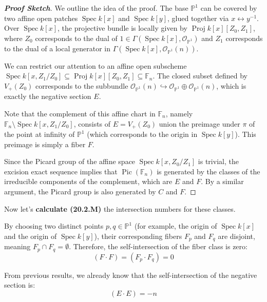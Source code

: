 \begin{proof}[\textbf{Proof Sketch}]
We outline the idea of the proof. The base $\mathbb{P}^1$ can be covered by two affine open patches $\operatorname{Spec} k[x]$ and $\operatorname{Spec} k[y]$, glued together via $x \leftrightarrow y^{-1}$. Over $\operatorname{Spec} k[x]$, the projective bundle is locally given by $\operatorname{Proj} k[x][Z_0, Z_1]$, where $Z_0$ corresponds to the dual of $1 \in \Gamma(\operatorname{Spec} k[x], \mathcal{O}_{\mathbb{P}^1})$ and $Z_1$ corresponds to the dual of a local generator in $\Gamma(\operatorname{Spec} k[x], \mathcal{O}_{\mathbb{P}^1}(n))$. 

We can restrict our attention to an affine open subscheme $\operatorname{Spec} k[x, Z_1/Z_0] \subseteq \operatorname{Proj} k[x][Z_0, Z_1] \subseteq \mathbb{F}_n$. The closed subset defined by $V_+(Z_0)$ corresponds to the subbundle $\mathcal{O}_{\mathbb{P}^1}(n) \hookrightarrow \mathcal{O}_{\mathbb{P}^1} \oplus \mathcal{O}_{\mathbb{P}^1}(n)$, which is exactly the negative section $E$.

Note that the complement of this affine chart in $\mathbb{F}_n$, namely $\mathbb{F}_n \setminus \operatorname{Spec} k[x, Z_1/Z_0]$, 
consists of $E = V_+(Z_0)$ union the preimage under $\pi$ of the point at infinity of $\mathbb{P}^1$ (which corresponds to the origin in $\operatorname{Spec} k[y]$). This preimage is simply a fiber $F$. 

Since the Picard group of the affine space $\operatorname{Spec} k[x, Z_0/Z_1]$ is trivial, the excision exact sequence implies that $\operatorname{Pic}(\mathbb{F}_n)$ is generated by the classes of the irreducible components of the complement, which are $E$ and $F$. By a similar argument, the Picard group is also generated by $C$ and $F$.
\end{proof}



Now let's \textbf{calculate (20.2.M)} the intersection numbers for these classes.

By choosing two distinct points $p, q \in \mathbb{P}^1$ (for example, the origin of $\operatorname{Spec} k[x]$ and the origin of $\operatorname{Spec} k[y]$), their corresponding fibers $F_p$ and $F_q$ are disjoint, meaning $F_p \cap F_q = \emptyset$. Therefore, the self-intersection of the fiber class is zero:
\[
(F \cdot F) = (F_p \cdot F_q) = 0
\]

From previous results, we already know that the self-intersection of the negative section is:
\[
(E \cdot E) = -n
\]

